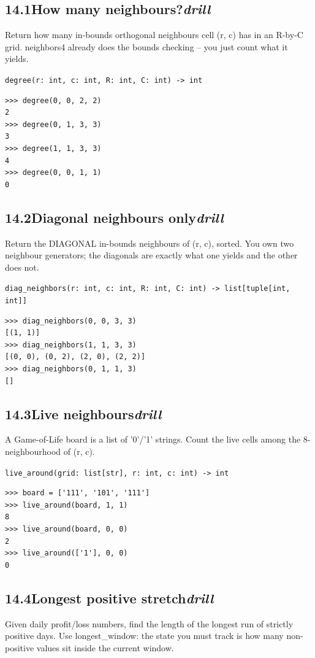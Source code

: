 \documentclass[10pt,letterpaper]{book}
\begin{document}
\subsection*{14.1\quad How many neighbours?\hfill\textnormal{\textit{drill}}}
Return how many in-bounds orthogonal neighbours cell (r, c) has in an R-by-C grid. neighbors4 already does the bounds checking -- you just count what it yields.

\noindent\texttt{degree(r: int, c: int, R: int, C: int) -> int}
\begin{lstlisting}[style=ex]
>>> degree(0, 0, 2, 2)
2
>>> degree(0, 1, 3, 3)
3
>>> degree(1, 1, 3, 3)
4
>>> degree(0, 0, 1, 1)
0
\end{lstlisting}
\subsection*{14.2\quad Diagonal neighbours only\hfill\textnormal{\textit{drill}}}
Return the DIAGONAL in-bounds neighbours of (r, c), sorted. You own two neighbour generators; the diagonals are exactly what one yields and the other does not.

\noindent\texttt{diag\_neighbors(r: int, c: int, R: int, C: int) -> list[tuple[int, int]]}
\begin{lstlisting}[style=ex]
>>> diag_neighbors(0, 0, 3, 3)
[(1, 1)]
>>> diag_neighbors(1, 1, 3, 3)
[(0, 0), (0, 2), (2, 0), (2, 2)]
>>> diag_neighbors(0, 1, 1, 3)
[]
\end{lstlisting}
\subsection*{14.3\quad Live neighbours\hfill\textnormal{\textit{drill}}}
A Game-of-Life board is a list of '0'/'1' strings. Count the live cells among the 8-neighbourhood of (r, c).

\noindent\texttt{live\_around(grid: list[str], r: int, c: int) -> int}
\begin{lstlisting}[style=ex]
>>> board = ['111', '101', '111']
>>> live_around(board, 1, 1)
8
>>> live_around(board, 0, 0)
2
>>> live_around(['1'], 0, 0)
0
\end{lstlisting}
\subsection*{14.4\quad Longest positive stretch\hfill\textnormal{\textit{drill}}}
Given daily profit/loss numbers, find the length of the longest run of strictly positive days. Use longest\_window: the state you must track is how many non-positive values sit inside the current window.
\end{document}
